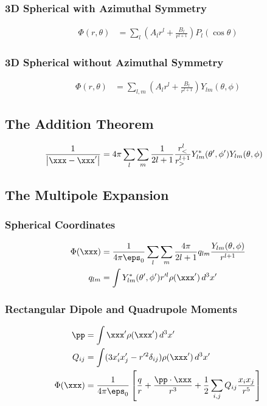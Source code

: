 \documentclass[11pt]{article}
\begin{document}
\subsubsection{3D Spherical with Azimuthal Symmetry}
\label{sec:org7ce477e}
\begin{align*}
\Phi(r, \theta) & = \sum_l \left( A_l r^l + \frac{B_l}{r^{l+1}} \right) P_l(\cos \theta)
\end{align*}
\subsubsection{3D Spherical without Azimuthal Symmetry}
\label{sec:org5d4bea2}
\begin{align*}
\Phi(r, \theta) & = \sum_{l,m} \left( A_l r^l + \frac{B_l}{r^{l+1}} \right) Y_{lm}(\theta, \phi)
\end{align*}
\subsection{The Addition Theorem}
\label{sec:orgdfa3e4b}
\begin{align*}
\frac{1}{\left| \xxx - \xxx' \right|} & = 4\pi \sum_l \sum_m \frac{1}{2l+1} \frac{r_<^l}{r_>^{l+1}} Y_{lm}^*(\theta', \phi') Y_{lm}(\theta, \phi)
\end{align*}
\subsection{The Multipole Expansion}
\label{sec:org1aef0ee}
\subsubsection{Spherical Coordinates}
\label{sec:org8d848d1}
\begin{align*}
\Phi(\xxx) & = \frac{1}{4\pi \eps_0} \sum_l \sum_m \frac{4\pi}{2l+1} q_{lm} \frac{Y_{lm}(\theta, \phi)}{r^{l+1}} \\
q_{lm} & = \int Y_{lm}^*(\theta', \phi') r^{\prime l} \rho(\xxx') \, d^3 x'
\end{align*}
\subsubsection{Rectangular Dipole and Quadrupole Moments}
\label{sec:org5072087}
\begin{align*}
\pp & = \int \xxx' \rho(\xxx') \, d^3 x' \\
Q_{ij} & = \int (3x_i' x_j' - r^{\prime 2} \delta_{ij}) \rho(\xxx') \, d^3 x' \\
\Phi(\xxx) & = \frac{1}{4\pi \eps_0} \left[ \frac{q}{r} + \frac{\pp \cdot \xxx}{r^3}
+ \frac{1}{2} \sum_{i,j} Q_{ij} \frac{x_i x_j}{r^5} \right]
\end{align*}
\end{document}

